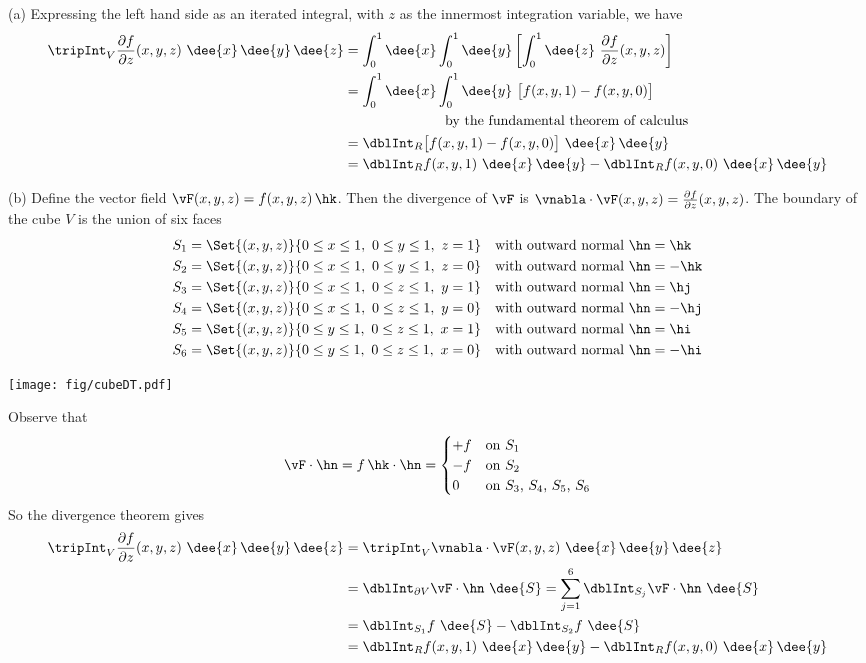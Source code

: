 \begin{solution} (a) Expressing the left hand side as an iterated integral,
with $z$ as the innermost integration variable, we have
\begin{align*}
\tripInt_V\frac{\partial f}{\partial z}(x,y,z)\ \dee{x}\,\dee{y}\,\dee{z}
&=\int_0^1\dee{x}\int_0^1\dee{y}\left[\int_0^1\dee{z}\ 
                \frac{\partial f}{\partial z}(x,y,z)\right] \\
&=\int_0^1\dee{x}\int_0^1\dee{y}\ \big[f(x,y,1)-f(x,y,0)\big] \\
&\hskip1in\text{by the fundamental theorem of calculus} \\
&=\dblInt_R\big[f(x,y,1)-f(x,y,0)\big]\ \dee{x}\,\dee{y} \\
&=\dblInt_R f(x,y,1)\ \dee{x}\,\dee{y}
  - \dblInt_R f(x,y,0)\ \dee{x}\,\dee{y}
\end{align*}


(b) Define the vector field $\vF(x,y,z) = f(x,y,z)\,\hk$. Then the divergence 
of $\vF$ is $\vnabla\cdot\vF(x,y,z) = \frac{\partial f}{\partial z}(x,y,z)$.
The boundary of the cube $V$ is the union of six faces
\begin{align*}
S_1&=\Set{(x,y,z)}{0\le x\le 1,\ 0\le y\le 1,\ z=1}\quad
   \text{with outward normal $\hn=\hk$} \\
S_2&=\Set{(x,y,z)}{0\le x\le 1,\ 0\le y\le 1,\ z=0}\quad
   \text{with outward normal $\hn=-\hk$} \\
S_3&=\Set{(x,y,z)}{0\le x\le 1,\ 0\le z\le 1,\ y=1}\quad
   \text{with outward normal $\hn=\hj$} \\
S_4&=\Set{(x,y,z)}{0\le x\le 1,\ 0\le z\le 1,\ y=0}\quad
   \text{with outward normal $\hn=-\hj$} \\
S_5&=\Set{(x,y,z)}{0\le y\le 1,\ 0\le z\le 1,\ x=1}\quad
   \text{with outward normal $\hn=\hi$} \\
S_6&=\Set{(x,y,z)}{0\le y\le 1,\ 0\le z\le 1,\ x=0}\quad
   \text{with outward normal $\hn=-\hi$} 
\end{align*}
\begin{center}
       \texttt{[image: fig/cubeDT.pdf]}
\end{center}
Observe that
\begin{align*}
\vF\cdot\hn = f\,\hk\cdot\hn = \begin{cases} +f &\text{on $S_1$} \\
                            -f &\text{on $S_2$} \\
                            0  &\text{on $S_3$, $S_4$, $S_5$, $S_6$}
             \end{cases}
\end{align*}
So the divergence theorem gives
\begin{align*}
\tripInt_V\frac{\partial f}{\partial z}(x,y,z)\ \dee{x}\,\dee{y}\,\dee{z}
&=\tripInt_V \vnabla\cdot\vF(x,y,z)\ \dee{x}\,\dee{y}\,\dee{z} \\
&= \dblInt_{\partial V} \vF\cdot\hn\ \dee{S}
=\sum_{j=1}^6  \dblInt_{S_j} \vF\cdot\hn\ \dee{S}\\
&=\dblInt_{S_1} f\ \dee{S}
     -\dblInt_{S_2} f\ \dee{S} \\
&=\dblInt_R f(x,y,1)\ \dee{x}\,\dee{y}
  - \dblInt_R f(x,y,0)\ \dee{x}\,\dee{y}
\end{align*}


\end{solution}
